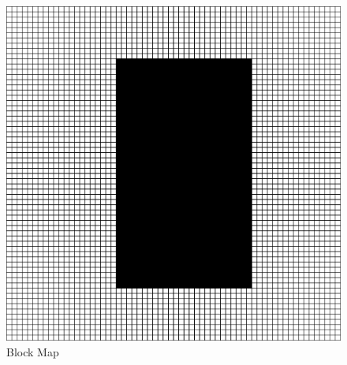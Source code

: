 \clearpage

\begin{figure}[h!]
    \centering
    \includegraphics[scale=0.82]{images/m2.png}
    \caption{Block Map}
    \label{fig: rep_Block Map}
\end{figure}

